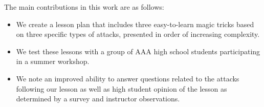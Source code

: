 The main contributions in this work are as follows:

\begin{itemize}

\item{We create a lesson plan that includes three easy-to-learn magic
  tricks based on three specific types of attacks,
    presented in order of increasing complexity.}

\item{We test these lessons with a group of AAA high school students
  participating in a summer workshop.}

\item{We note an improved ability to answer questions related to the
  attacks following our lesson as well as high student opinion of the
    lesson as determined by a survey and instructor observations.}

\end{itemize}
